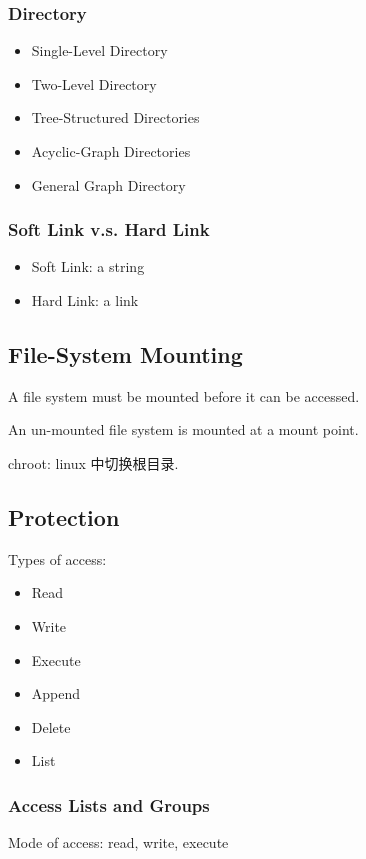 \subsubsection{Directory}%
\begin{itemize}
    \item Single-Level Directory
    \item Two-Level Directory
    \item Tree-Structured Directories
    \item Acyclic-Graph Directories
    \item General Graph Directory
\end{itemize}

\subsubsection{Soft Link v.s. Hard Link}
\begin{itemize}
    \item Soft Link: a string
    \item Hard Link: a link
\end{itemize}


\subsection{File-System Mounting}
A file system must be mounted before it can be accessed. 

An un-mounted file system is mounted at a mount point. 

chroot: linux 中切换根目录. 

\subsection{Protection}
Types of access:
\begin{itemize}
    \item Read
    \item Write
    \item Execute
    \item Append
    \item Delete
    \item List
\end{itemize}


\subsubsection{Access Lists and Groups}
Mode of access: read, write, execute

